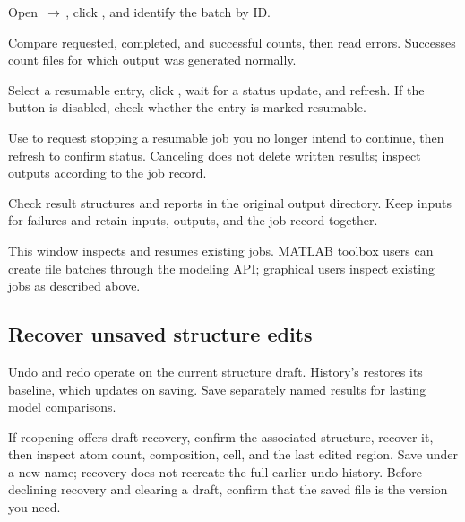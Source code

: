\begin{steps}
  \item Open \,$\rightarrow$\,, click , and identify the batch by ID.
  \item Compare requested, completed, and successful counts, then read errors. Successes count files for which output was generated normally.
  \item Select a resumable entry, click , wait for a status update, and refresh. If the button is disabled, check whether the entry is marked resumable.
  \item Use  to request stopping a resumable job you no longer intend to continue, then refresh to confirm status. Canceling does not delete written results; inspect outputs according to the job record.
  \item Check result structures and reports in the original output directory. Keep inputs for failures and retain inputs, outputs, and the job record together.
\end{steps}

This window inspects and resumes existing jobs. MATLAB\regmark{} toolbox users can create file batches through the modeling API; graphical users inspect existing jobs as described above.

\subsection{Recover unsaved structure edits}\label{sec:modeling-draft-reference}

Undo and redo operate on the current structure draft. History's  restores its baseline, which updates on saving. Save separately named results for lasting model comparisons.

If reopening offers draft recovery, confirm the associated structure, recover it, then inspect atom count, composition, cell, and the last edited region. Save under a new name; recovery does not recreate the full earlier undo history. Before declining recovery and clearing a draft, confirm that the saved file is the version you need.
